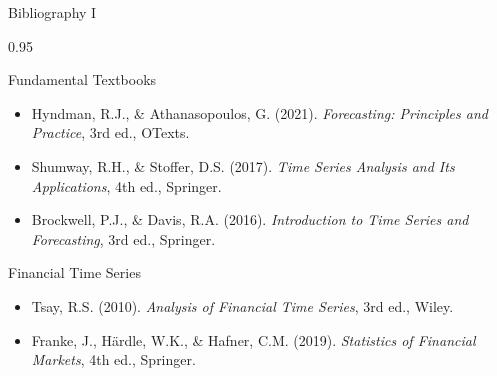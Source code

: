 \documentclass[9pt, aspectratio=169, t]{beamer}
\begin{document}
\begin{frame}{Bibliography I}
    \begin{cminipage}{0.95\textwidth}
    \begin{block}{Fundamental Textbooks}
        {\small
        \begin{itemize}\setlength{\itemsep}{0pt}
            \item Hyndman, R.J., \& Athanasopoulos, G. (2021). \textit{Forecasting: Principles and Practice}, 3rd ed., OTexts.
            \item Shumway, R.H., \& Stoffer, D.S. (2017). \textit{Time Series Analysis and Its Applications}, 4th ed., Springer.
            \item Brockwell, P.J., \& Davis, R.A. (2016). \textit{Introduction to Time Series and Forecasting}, 3rd ed., Springer.
        \end{itemize}
        }
    \end{block}

    \begin{exampleblock}{Financial Time Series}
        {\small
        \begin{itemize}\setlength{\itemsep}{0pt}
            \item Tsay, R.S. (2010). \textit{Analysis of Financial Time Series}, 3rd ed., Wiley.
            \item Franke, J., H\"ardle, W.K., \& Hafner, C.M. (2019). \textit{Statistics of Financial Markets}, 4th ed., Springer.
        \end{itemize}
        }
    \end{exampleblock}
    \end{cminipage}
\end{frame}
\end{document}
